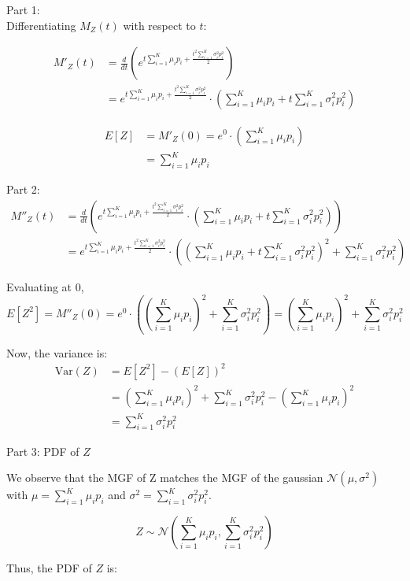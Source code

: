 \documentclass[a4paper,12pt,answers]{exam}
\begin{document}
\begin{questions}
\begin{solution}
Part 1:\\
Differentiating $M_Z(t)$ with respect to $t$:

\begin{align*}
M'_Z(t) &= \frac{d}{dt} \left(e^{t \sum_{i=1}^K \mu_i p_i + \frac{t^2 \sum_{i=1}^K \sigma_i^2 p_i^2}{2}}\right)\\
&= e^{t \sum_{i=1}^K \mu_i p_i + \frac{t^2 \sum_{i=1}^K \sigma_i^2 p_i^2}{2}} \cdot \left(\sum_{i=1}^K \mu_i p_i + t \sum_{i=1}^K \sigma_i^2 p_i^2\right)    
\end{align*}

\begin{align*}
E[Z] &= M'_Z(0) = e^0 \cdot \left(\sum_{i=1}^K \mu_i p_i\right) \\
&= \sum_{i=1}^K \mu_i p_i
\end{align*}

Part 2:
\begin{align*}
M''_Z(t) &= \frac{d}{dt} \left( e^{t \sum_{i=1}^K \mu_i p_i + \frac{t^2 \sum_{i=1}^K \sigma_i^2 p_i^2}{2}} \cdot \left(\sum_{i=1}^K \mu_i p_i + t \sum_{i=1}^K \sigma_i^2 p_i^2\right) \right)\\
&= e^{t \sum_{i=1}^K \mu_i p_i + \frac{t^2 \sum_{i=1}^K \sigma_i^2 p_i^2}{2}} \cdot \left( \left(\sum_{i=1}^K \mu_i p_i + t \sum_{i=1}^K \sigma_i^2 p_i^2\right)^2 + \sum_{i=1}^K \sigma_i^2 p_i^2 \right)
\end{align*}

Evaluating at 0,
\[
E[Z^2]= M''_Z(0) = e^0 \cdot \left( \left(\sum_{i=1}^K \mu_i p_i\right)^2 + \sum_{i=1}^K \sigma_i^2 p_i^2 \right) = \left(\sum_{i=1}^K \mu_i p_i\right)^2 + \sum_{i=1}^K \sigma_i^2 p_i^2
\]

Now, the variance is:
\begin{align*}
\text{Var}(Z) &= E[Z^2] - (E[Z])^2\\
&= \left(\sum_{i=1}^K \mu_i p_i\right)^2 + \sum_{i=1}^K \sigma_i^2 p_i^2 - \left(\sum_{i=1}^K \mu_i p_i\right)^2\\
&= \sum_{i=1}^K \sigma_i^2 p_i^2
\end{align*}


Part 3: PDF of $Z$

We observe that the MGF of Z matches the MGF of the gaussian $\mathcal{N}(\mu, \sigma^2)$ with $\mu=\sum_{i=1}^K \mu_i p_i$ and $\sigma^2=\sum_{i=1}^K \sigma_i^2 p_i^2$.

\[
Z \sim \mathcal{N}\left(\sum_{i=1}^K \mu_i p_i, \sum_{i=1}^K \sigma_i^2 p_i^2\right)
\]

Thus, the PDF of $Z$ is:


\end{solution}
\end{questions}
\end{document}
